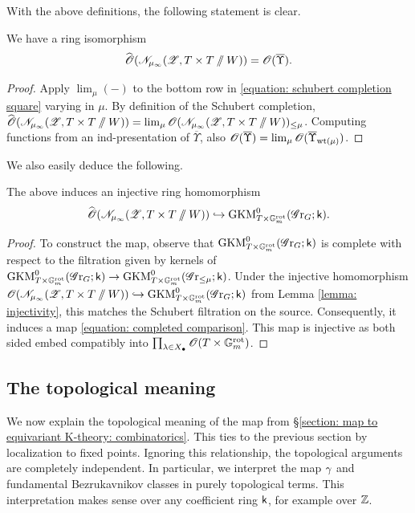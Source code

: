 With the above definitions, the following statement is clear.
\begin{lemma}\label{lemma: completed deformation as functions on Upsilon}
We have a ring isomorphism
    \begin{equation*}
        \widehat{\operatorname{\mathscr{O}}}(\mathscr{N}_{\mu_{\infty}}(\operatorname{\mathscr{Z}}, T \times T \sslash W)) = \operatorname{\mathscr{O}}(\overline{\Upsilon}).
    \end{equation*}
\end{lemma}
\begin{proof}
Apply $\lim_{\mu}(-)$ to the bottom row in \eqref{equation: schubert completion square} varying in $\mu$. By definition of the Schubert completion, $\widehat{\operatorname{\mathscr{O}}}(\mathscr{N}_{\mu_{\infty}}(\operatorname{\mathscr{Z}}, T \times T \sslash W)) = \operatorname*{lim}_{\mu} \operatorname{\mathscr{O}}(\mathscr{N}_{\mu_{\infty}}(\operatorname{\mathscr{Z}}, T \times T \sslash W))_{\leq \mu}$. Computing functions from an ind-presentation of $\overline{\Upsilon}$, also $\operatorname{\mathscr{O}}(\overline{\Upsilon}) = \operatorname*{lim}_{\mu} \operatorname{\mathscr{O}}(\overline{\Upsilon}_{\operatorname{wt}(\mu)})$.
\end{proof}


We also easily deduce the following.
\begin{lemma}\label{lemma: completed comparison}
The above induces an injective ring homomorphism
\begin{equation}\label{equation: completed comparison}
    \widehat{\operatorname{\mathscr{O}}}(\mathscr{N}_{\mu_{\infty}}(\operatorname{\mathscr{Z}}, T \times T \sslash W)) \hookrightarrow \operatorname{GKM}^{0}_{T \times \mathbb{G}_m^{\mathrm{rot}}}(\operatorname{\mathscr{G}r}_G; \mathsf{k}).
\end{equation}
\end{lemma}
\begin{proof}
To construct the map, observe that $\operatorname{GKM}^{0}_{T \times \mathbb{G}_m^{\mathrm{rot}}}(\operatorname{\mathscr{G}r}_G; \mathsf{k})$ is complete with respect to the filtration given by kernels of $\operatorname{GKM}^{0}_{T \times \mathbb{G}_m^{\mathrm{rot}}}(\operatorname{\mathscr{G}r}_G; \mathsf{k}) \to \operatorname{GKM}^{0}_{T \times \mathbb{G}_m^{\mathrm{rot}}}(\operatorname{\mathscr{G}r}_{\leq \mu}; \mathsf{k})$. Under the injective homomorphism ${\operatorname{\mathscr{O}}}(\mathscr{N}_{\mu_{\infty}}(\operatorname{\mathscr{Z}}, T \times T \sslash W)) \hookrightarrow \operatorname{GKM}^{0}_{T \times \mathbb{G}_m^{\mathrm{rot}}}(\operatorname{\mathscr{G}r}_G; \mathsf{k})$ from Lemma \ref{lemma: injectivity}, this matches the Schubert filtration on the source. Consequently, it induces a map \eqref{equation: completed comparison}. This map is injective as both sided embed compatibly into $\prod_{\lambda \in X_{\bullet}} \operatorname{\mathscr{O}}(T \times \mathbb{G}_m^{\mathrm{rot}})$.
\end{proof}



\subsection{The topological meaning}\label{section: map to equivariant K-theory: topology}
We now explain the topological meaning of the map from \S \ref{section: map to equivariant K-theory: combinatorics}. This ties to the previous section by localization to fixed points. Ignoring this relationship, the topological arguments are completely independent.
In particular, we interpret the map $\gamma$ and fundamental Bezrukavnikov classes in purely topological terms. This interpretation makes sense over any coefficient ring $\mathsf{k}$, for example over $\operatorname{\mathbb{Z}}$.

